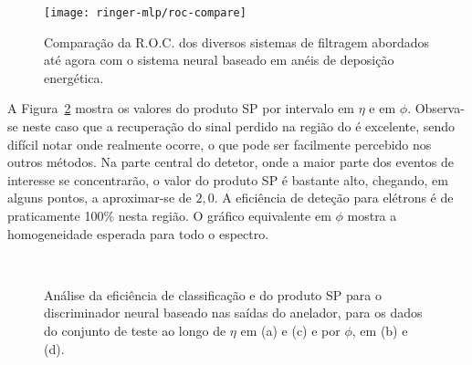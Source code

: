 \begin{figure}
\begin{center}
\texttt{[image: ringer-mlp/roc-compare]}
\end{center}
\caption{Comparação da R.O.C. dos diversos sistemas de filtragem abordados até
agora com o sistema neural baseado em anéis de deposição energética.} 
\label{fig:ringer-test-roc}
\end{figure}

A Figura~\ref{fig:ringer-eta-phi} mostra os valores do produto SP por
intervalo em $\eta$ e em $\phi$. Observa-se neste caso que a recuperação do
sinal perdido na região do  é excelente, sendo difícil notar onde
realmente ocorre, o que pode ser facilmente percebido nos outros métodos. Na
parte central do detetor, onde a maior parte dos eventos de interesse se
concentrarão, o valor do produto SP é bastante alto, chegando, em alguns
pontos, a aproximar-se de $2,0$. A eficiência de deteção para elétrons é de
praticamente 100\% nesta região. O gráfico equivalente em $\phi$ mostra a
homogeneidade esperada para todo o espectro.

\begin{figure}
\begin{center}
\mbox{%
}
\mbox{%
}
\end{center}
\caption{Análise da eficiência de classificação e do produto SP para o
discriminador neural baseado nas saídas do anelador, para os dados do conjunto
de teste ao longo de $\eta$ em (a) e (c) e por $\phi$, em (b) e (d).}
\label{fig:ringer-eta-phi}
\end{figure}



